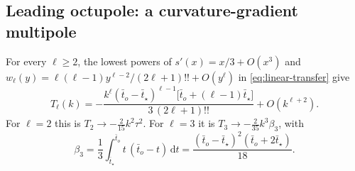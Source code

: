 \documentclass[11pt]{article}
\theoremstyle{definition}
\theoremstyle{remark}
\newcommand{\dd}{\mathrm{d}}
\begin{document}
\subsection{Leading octupole: a curvature-gradient multipole}\label{sec:sh-octupole}
For every $\ell\ge2$, the lowest powers of $s'(x)=x/3+O(x^3)$ and
$w_\ell(y)=\ell(\ell-1)y^{\ell-2}/(2\ell+1)!!+O(y^\ell)$ in \eqref{eq:linear-transfer} give
\begin{equation}\label{eq:Tl-leading}
T_\ell(k)=-\frac{k^\ell(\bar t_o-\bar t_\star)^{\ell-1}\big[\bar t_o+(\ell-1)\bar t_\star\big]}{3\,(2\ell+1)!!}
+O(k^{\ell+2}).
\end{equation}
For $\ell=2$ this is $T_2\to-\frac2{15}k^2\tau^2$. For $\ell=3$ it is
$T_3\to-\frac2{35}k^3\beta_3$, with
\[
\beta_3=\frac13\int_{\bar t_\star}^{\bar t_o}t\,(\bar t_o-t)\,\dd t
=\frac{(\bar t_o-\bar t_\star)^2(\bar t_o+2\bar t_\star)}{18}.
\]
\end{document}
